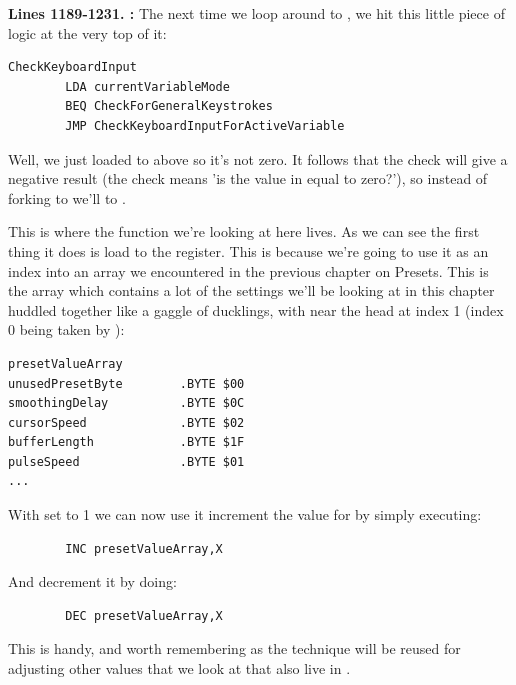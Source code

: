 \textbf{Lines 1189-1231. :}  The next time we loop around
to , we hit this little piece of logic at the very top of it:

\begin{lstlisting}
CheckKeyboardInput   
        LDA currentVariableMode
        BEQ CheckForGeneralKeystrokes
        JMP CheckKeyboardInputForActiveVariable
\end{lstlisting}

Well, we just loaded  to  above so it's not zero.  It follows that
the  check will give a negative result (the check means 'is the value in  equal to zero?'), 
so instead of forking to  we'll  to .

This is where the function we're looking at here lives. As we can see the first thing it does is load 
 to the  register. This is because we're going to use it as an index
into an array we encountered in the previous chapter on Presets. This is the array 
which contains a lot of the settings we'll be looking at in this chapter huddled together like a gaggle
of ducklings, with  near the head at index 1 (index 0 being taken by ):

\begin{lstlisting}
presetValueArray
unusedPresetByte        .BYTE $00
smoothingDelay          .BYTE $0C
cursorSpeed             .BYTE $02
bufferLength            .BYTE $1F
pulseSpeed              .BYTE $01
...
\end{lstlisting}

With  set to 1 we can now use it increment the value for  by
simply executing:
\begin{lstlisting}
        INC presetValueArray,X
\end{lstlisting}
And decrement it by doing:
\begin{lstlisting}
        DEC presetValueArray,X
\end{lstlisting}
This is handy, and worth remembering as the technique will be reused for adjusting other values that 
we look at that also live in .

\clearpage

